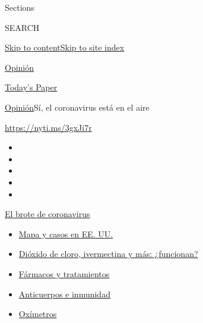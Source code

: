 Sections

SEARCH

\protect\hyperlink{site-content}{Skip to
content}\protect\hyperlink{site-index}{Skip to site index}

\href{https://www.nytimes.com/es/section/opinion}{Opinión}

\href{https://myaccount.nytimes.com/auth/login?response_type=cookie\&client_id=vi}{}

\href{https://www.nytimes.com/section/todayspaper}{Today's Paper}

\href{/es/section/opinion}{Opinión}\textbar{}Sí, el coronavirus está en
el aire

\url{https://nyti.ms/3gxJi7r}

\begin{itemize}
\item
\item
\item
\item
\item
\end{itemize}

\href{https://www.nytimes.com/es/spotlight/coronavirus?action=click\&pgtype=Article\&state=default\&region=TOP_BANNER\&context=storylines_menu}{El
brote de coronavirus}

\begin{itemize}
\tightlist
\item
  \href{https://www.nytimes.com/es/interactive/2020/espanol/mundo/coronavirus-en-estados-unidos.html?action=click\&pgtype=Article\&state=default\&region=TOP_BANNER\&context=storylines_menu}{Mapa
  y casos en EE. UU.}
\item
  \href{https://www.nytimes.com/es/2020/07/23/espanol/america-latina/bolivia-cloro-coronavirus-ivermectina.html?action=click\&pgtype=Article\&state=default\&region=TOP_BANNER\&context=storylines_menu}{Dióxido
  de cloro, ivermectina y más: ¿funcionan?}
\item
  \href{https://www.nytimes.com/es/interactive/2020/science/coronavirus-tratamientos-curas.html?action=click\&pgtype=Article\&state=default\&region=TOP_BANNER\&context=storylines_menu}{Fármacos
  y tratamientos}
\item
  \href{https://www.nytimes.com/es/2020/07/28/espanol/ciencia-y-tecnologia/anticuerpos-coronavirus-inmunidad.html?action=click\&pgtype=Article\&state=default\&region=TOP_BANNER\&context=storylines_menu}{Anticuerpos
  e inmunidad}
\item
  \href{https://www.nytimes.com/es/2020/04/29/espanol/estilos-de-vida/oximetro-para-que-sirve.html?action=click\&pgtype=Article\&state=default\&region=TOP_BANNER\&context=storylines_menu}{Oxímetros}
\end{itemize}

